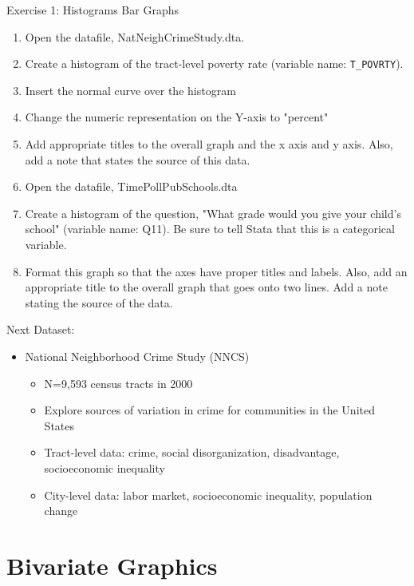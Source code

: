 \documentclass[table,smaller]{beamer}
\begin{document}
\begin{frame}[fragile,label=sec-2-8]{Exercise 1: Histograms Bar Graphs}
 \begin{enumerate}
\item Open the datafile, NatNeighCrimeStudy.dta.
\item Create a histogram of the tract-level poverty rate (variable name: \texttt{T\_POVRTY}).
\item Insert the normal curve over the histogram
\item Change the numeric representation on the Y-axis to "percent"
\item Add appropriate titles to the overall graph and the x axis and y axis.  Also, add a note that states the source of this data.
\item Open the datafile, TimePollPubSchools.dta
\item Create  a histogram of the question, "What grade would you give your child’s school" (variable name: Q11).  Be sure to tell Stata that this is a categorical variable.
\item Format this graph so that the axes have proper titles and labels.  Also, add an appropriate title to the overall graph that goes onto two lines.  Add a note stating the source of the data.
\end{enumerate}
\end{frame}

\begin{frame}[label=sec-2-9]{Next Dataset:}
\begin{itemize}
\item National  Neighborhood Crime Study (NNCS)
\begin{itemize}
\item N=9,593 census tracts in 2000
\item Explore sources of variation in crime for communities in the United States
\item Tract-level data: crime, social disorganization, disadvantage, socioeconomic inequality
\item City-level data: labor market, socioeconomic inequality, population change
\end{itemize}
\end{itemize}
\end{frame}

\section{Bivariate Graphics}
\label{sec-3}
\end{document}
